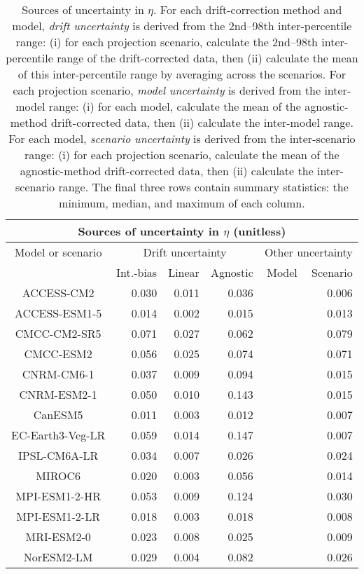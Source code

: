 \begin{table*}[t]
\centering
\caption{Sources of uncertainty in $\eta$. For each drift-correction method and model, \emph{drift uncertainty} is derived from the 2nd--98th inter-percentile range: (i) for each projection scenario, calculate the 2nd--98th inter-percentile range of the drift-corrected data, then (ii) calculate the mean of this inter-percentile range by averaging across the scenarios. For each projection scenario, \emph{model uncertainty} is derived from the inter-model range: (i) for each model, calculate the mean of the agnostic-method drift-corrected data, then (ii) calculate the inter-model range. For each model, \emph{scenario uncertainty} is derived from the inter-scenario range: (i) for each projection scenario, calculate the mean of the agnostic-method drift-corrected data, then (ii) calculate the inter-scenario range. The final three rows contain summary statistics: the minimum, median, and maximum of each column.}
\begin{tabular}{c|rrr|rr}
\toprule
\multicolumn{6}{c}{Sources of uncertainty in $\eta$ (unitless)} \\ 
\midrule
Model or scenario & \multicolumn{3}{c|}{Drift uncertainty} & \multicolumn{2}{c}{Other uncertainty} \\
 & Int.-bias & Linear & Agnostic & Model & Scenario \\
\midrule
ACCESS-CM2 & 0.030 & 0.011 & 0.036 &  & 0.006 \\
ACCESS-ESM1-5 & 0.014 & 0.002 & 0.015 &  & 0.013 \\
CMCC-CM2-SR5 & 0.071 & 0.027 & 0.062 &  & 0.079 \\
CMCC-ESM2 & 0.056 & 0.025 & 0.074 &  & 0.071 \\
CNRM-CM6-1 & 0.037 & 0.009 & 0.094 &  & 0.015 \\
CNRM-ESM2-1 & 0.050 & 0.010 & 0.143 &  & 0.015 \\
CanESM5 & 0.011 & 0.003 & 0.012 &  & 0.007 \\
EC-Earth3-Veg-LR & 0.059 & 0.014 & 0.147 &  & 0.007 \\
IPSL-CM6A-LR & 0.034 & 0.007 & 0.026 &  & 0.024 \\
MIROC6 & 0.020 & 0.003 & 0.056 &  & 0.014 \\
MPI-ESM1-2-HR & 0.053 & 0.009 & 0.124 &  & 0.030 \\
MPI-ESM1-2-LR & 0.018 & 0.003 & 0.018 &  & 0.008 \\
MRI-ESM2-0 & 0.023 & 0.008 & 0.025 &  & 0.009 \\
NorESM2-LM & 0.029 & 0.004 & 0.082 &  & 0.026 \\

\end{tabular}
\end{table*}
